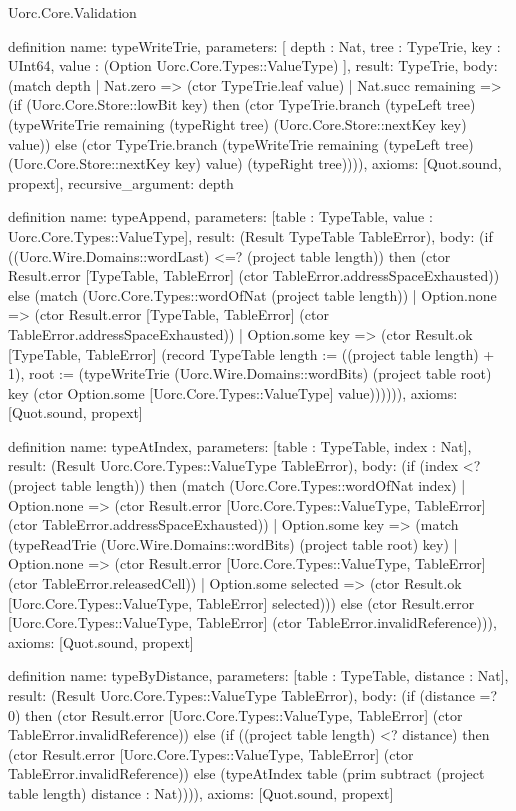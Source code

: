 \begin{lexlean}{Uorc.Core.Validation}
\begin{semanticmodule}
definition{
  name: typeWriteTrie,
  parameters: [
    depth : Nat,
    tree : TypeTrie,
    key : UInt64,
    value : (Option Uorc.Core.Types::ValueType)
  ],
  result: TypeTrie,
  body: (match depth
    | Nat.zero => (ctor TypeTrie.leaf value)
    | Nat.succ remaining => (if (Uorc.Core.Store::lowBit key) then (ctor TypeTrie.branch (typeLeft tree) (typeWriteTrie remaining (typeRight tree) (Uorc.Core.Store::nextKey key) value)) else (ctor TypeTrie.branch (typeWriteTrie remaining (typeLeft tree) (Uorc.Core.Store::nextKey key) value) (typeRight tree)))),
  axioms: [Quot.sound, propext],
  recursive_argument: depth
}

definition{
  name: typeAppend,
  parameters: [table : TypeTable, value : Uorc.Core.Types::ValueType],
  result: (Result TypeTable TableError),
  body: (if ((Uorc.Wire.Domains::wordLast) <=? (project table length)) then (ctor Result.error [TypeTable, TableError] (ctor TableError.addressSpaceExhausted)) else (match (Uorc.Core.Types::wordOfNat (project table length))
    | Option.none => (ctor Result.error [TypeTable, TableError] (ctor TableError.addressSpaceExhausted))
    | Option.some key => (ctor Result.ok [TypeTable, TableError] (record TypeTable {length := ((project table length) + 1), root := (typeWriteTrie (Uorc.Wire.Domains::wordBits) (project table root) key (ctor Option.some [Uorc.Core.Types::ValueType] value))})))),
  axioms: [Quot.sound, propext]
}

definition{
  name: typeAtIndex,
  parameters: [table : TypeTable, index : Nat],
  result: (Result Uorc.Core.Types::ValueType TableError),
  body: (if (index <? (project table length)) then (match (Uorc.Core.Types::wordOfNat index)
    | Option.none => (ctor Result.error [Uorc.Core.Types::ValueType, TableError] (ctor TableError.addressSpaceExhausted))
    | Option.some key => (match (typeReadTrie (Uorc.Wire.Domains::wordBits) (project table root) key)
      | Option.none => (ctor Result.error [Uorc.Core.Types::ValueType, TableError] (ctor TableError.releasedCell))
      | Option.some selected => (ctor Result.ok [Uorc.Core.Types::ValueType, TableError] selected))) else (ctor Result.error [Uorc.Core.Types::ValueType, TableError] (ctor TableError.invalidReference))),
  axioms: [Quot.sound, propext]
}

definition{
  name: typeByDistance,
  parameters: [table : TypeTable, distance : Nat],
  result: (Result Uorc.Core.Types::ValueType TableError),
  body: (if (distance =? 0) then (ctor Result.error [Uorc.Core.Types::ValueType, TableError] (ctor TableError.invalidReference)) else (if ((project table length) <? distance) then (ctor Result.error [Uorc.Core.Types::ValueType, TableError] (ctor TableError.invalidReference)) else (typeAtIndex table (prim subtract (project table length) distance : Nat)))),
  axioms: [Quot.sound, propext]
}


\end{semanticmodule}
\end{lexlean}
